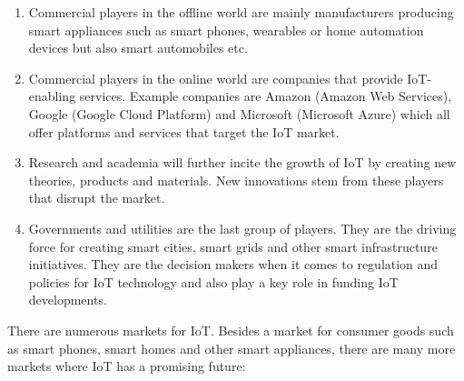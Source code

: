 		\begin{enumerate}
			\item Commercial players in the offline world are mainly manufacturers producing smart appliances such as smart phones, wearables or home automation devices but also smart automobiles etc.

			\item Commercial players in the online world are companies that provide IoT-enabling services. Example companies are Amazon (Amazon Web Services), Google (Google Cloud Platform) and Microsoft (Microsoft Azure) which all offer platforms and services that target the IoT market.

			\item Research and academia will further incite the growth of IoT by creating new theories, products and materials. New innovations stem from these players that disrupt the market.

			\item Governments and utilities are the last group of players. They are the driving force for creating smart cities, smart grids and other smart infrastructure initiatives. They are the decision makers when it comes to regulation and policies for IoT technology and also play a key role in funding IoT developments.
		\end{enumerate}
		 			
		There are numerous markets for IoT. Besides a market for consumer goods such as smart phones, smart homes and other smart appliances, there are many more markets where IoT has a promising future:

